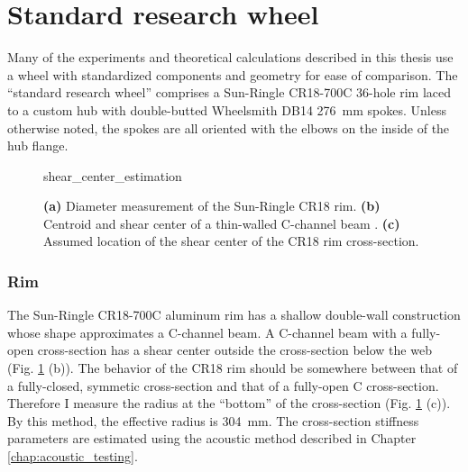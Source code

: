 \documentclass[../../thesis.tex]{subfiles}
\begin{document}
\section{Standard research wheel}
\label{app:std_research_wheel}

Many of the experiments and theoretical calculations described in this thesis use a wheel with standardized components and geometry for ease of comparison. The ``standard research wheel'' comprises a Sun-Ringle CR18-700C 36-hole rim laced to a custom hub with double-butted Wheelsmith DB14 \SI{276}{mm} spokes. Unless otherwise noted, the spokes are all oriented with the elbows on the inside of the hub flange.

\begin{figure}[h]
\centering
{shear_center_estimation}
\caption[Diameter measurement of CR18 rim]{\textbf{(a)} Diameter measurement of the Sun-Ringle CR18 rim. \textbf{(b)} Centroid and shear center of a thin-walled C-channel beam \cite{Timoshenko1961}. \textbf{(c)} Assumed location of the shear center of the CR18 rim cross-section.}
\label{fig:shear_center_estimation}
\end{figure}

\subsubsection*{Rim}

The Sun-Ringle CR18-700C aluminum rim has a shallow double-wall construction whose shape approximates a C-channel beam. A C-channel beam with a fully-open cross-section has a shear center outside the cross-section below the web \cite{Timoshenko1961} (Fig. \ref{fig:shear_center_estimation} (b)). The behavior of the CR18 rim should be somewhere between that of a fully-closed, symmetic cross-section and that of a fully-open C cross-section. Therefore I measure the radius at the ``bottom'' of the cross-section (Fig. \ref{fig:shear_center_estimation} (c)). By this method, the effective radius is \SI{304}{mm}. The cross-section stiffness parameters are estimated using the acoustic method described in Chapter \ref{chap:acoustic_testing}.
\end{document}
